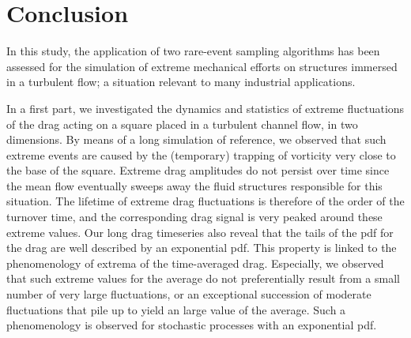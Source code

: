 \documentclass[pre,aps,floatfix,10pt,superscriptaddress, notitlepage,preprint]{revtex4-1}
\begin{document}
%






\section{Conclusion}
\label{conlusion}
In this study, the application of two rare-event sampling algorithms has been assessed for the simulation of extreme mechanical efforts on structures immersed in a turbulent flow; a situation relevant to many industrial applications.


In a first part, we investigated the dynamics and statistics of extreme fluctuations of the drag acting on a square placed in a turbulent channel flow, in two dimensions.
By means of a long simulation of reference, we observed that such extreme events are caused by the (temporary) trapping of vorticity very close to the base of the square.
Extreme drag amplitudes do not persist over time since the mean flow eventually sweeps away the fluid structures responsible for this situation.
%
The lifetime of extreme drag fluctuations is therefore of the order of the turnover time, and the corresponding drag signal is very peaked around these extreme values.
Our long drag timeseries also reveal that the tails of the \ac{pdf} for the drag are  well described by an exponential \ac{pdf}.
This property is linked to the phenomenology of extrema of the time-averaged drag.
Especially, we observed that such extreme values for the average do not preferentially result from a small number of very large fluctuations, or an exceptional succession of moderate fluctuations that
pile up to yield an large value of the average.
Such a phenomenology is observed for stochastic processes with an exponential \ac{pdf}.
\end{document}
